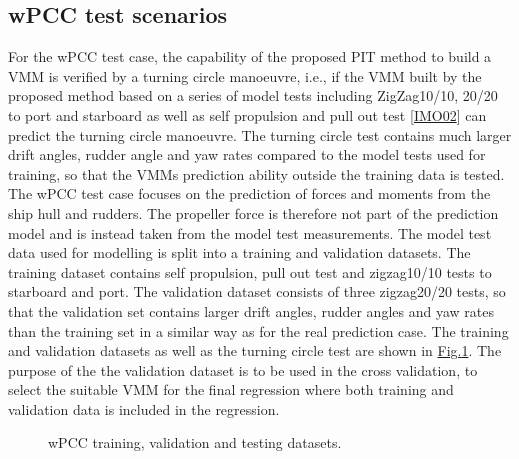 \documentclass[review]{elsarticle}
\begin{document}
\subsection{wPCC test scenarios}
\label{\detokenize{05.01_case_studies:wpcc-test-scenarios}}
\sphinxAtStartPar
For the wPCC test case, the capability of the proposed PIT method to build a VMM is verified by a turning circle manoeuvre, i.e., if the VMM built by the proposed method based on a series of model tests including ZigZag10/10, 20/20 to port and starboard as well as self propulsion and pull out test {[}\hyperlink{cite.bibligraphy:id16}{IMO02}{]} can predict the turning circle manoeuvre. The turning circle test contains much larger drift angles, rudder angle and yaw rates compared to the model tests used for training, so that the VMMs prediction ability outside the training data is tested.
The wPCC test case focuses on the prediction of forces and moments from the ship hull and rudders. The propeller force is therefore not part of the prediction model and is instead taken from the model test measurements.
The model test data used for modelling is split into a training and validation datasets. The training dataset contains self propulsion, pull out test and zigzag10/10 tests to starboard and port. The validation dataset consists of three zigzag20/20 tests, so that the validation set contains larger drift angles, rudder angles and yaw rates than the training set in a similar way as for the real prediction case. The training and validation datasets as well as the turning circle test are shown in \hyperref[\detokenize{05.01_case_studies:fig-traintest}]{Fig.\@ \ref{\detokenize{05.01_case_studies:fig-traintest}}}.
The purpose of the the validation dataset is to be used in the cross validation, to select the suitable VMM for the final regression where both training and validation data is included in the regression.

\begin{figure}[H]
\centering
\capstart

\noindent{}
\caption{wPCC training, validation and testing datasets.}\label{\detokenize{05.01_case_studies:fig-traintest}}\end{figure}
\end{document}
